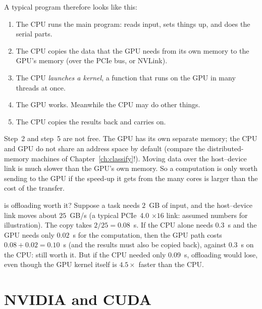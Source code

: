 A typical program therefore looks like this:
\begin{enumerate}
  \item The CPU runs the main program: reads input, sets things up, and does the serial parts.
  \item The CPU copies the data that the GPU needs from its own memory to the GPU's memory
        (over the PCIe bus, or NVLink).
  \item The CPU \emph{launches a kernel}, a function that runs on the GPU in many threads at once.
  \item The GPU works. Meanwhile the CPU may do other things.
  \item The CPU copies the results back and carries on.
\end{enumerate}

\begin{pitfall}
Step~2 and step~5 are not free. The GPU has its own separate memory; the CPU and GPU do not
share an address space by default (compare the distributed-memory machines of Chapter~\ref{ch:classify}!).
Moving data over the host--device link is much slower than the GPU's own memory. So a computation is only worth sending to the GPU if the speed-up it gets from the many cores is larger than the cost of the transfer.
\end{pitfall}

\begin{workedex}{is offloading worth it?}
Suppose a task needs $2$~GB of input, and the host--device link moves about $25$~GB/s (a typical PCIe~4.0 $\times16$ link: assumed numbers for illustration).
The copy takes $2/25=0.08$~s. If the CPU alone needs $0.3$~s and the GPU needs only $0.02$~s for the computation,
then the GPU path costs $0.08+0.02=0.10$~s (and the results must also be copied back), against $0.3$~s on the CPU:
still worth it. But if the CPU needed only $0.09$~s, offloading would lose, even though the
GPU kernel itself is $4.5\times$ faster than the CPU.
\end{workedex}

\section{NVIDIA and CUDA}

